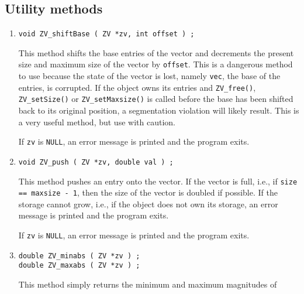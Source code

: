 \subsection{Utility methods}
\label{subsection:ZV:proto:utilities}
\par
\par
\begin{enumerate}
\item
\begin{verbatim}
void ZV_shiftBase ( ZV *zv, int offset ) ;
\end{verbatim}
This method shifts the base entries of the vector and decrements
the present size and maximum size of the vector by {\tt offset}.
This is a dangerous method to use because the state of the vector
is lost, namely {\tt vec}, the base of the entries, is corrupted.
If the object owns its entries and {\tt ZV\_free()}, 
{\tt ZV\_setSize()} or {\tt ZV\_setMaxsize()} is called before 
the base has been shifted back to
its original position, a segmentation violation will likely result.
This is a very useful method, but use with caution.
\par {}
If {\tt zv} is {\tt NULL}, 
an error message is printed and the program exits.
\item
\begin{verbatim}
void ZV_push ( ZV *zv, double val ) ;
\end{verbatim}
This method pushes an entry onto the vector.
If the vector is full, i.e., if {\tt size == maxsize - 1},
then the size of the vector is doubled if possible.
If the storage cannot grow, i.e., if the object does not own its
storage, an error message is printed and the program exits.
\par {}
If {\tt zv} is {\tt NULL}, 
an error message is printed and the program exits.
\item
\begin{verbatim}
double ZV_minabs ( ZV *zv ) ;
double ZV_maxabs ( ZV *zv ) ;
\end{verbatim}
This method simply returns the minimum and maximum magnitudes of

\end{enumerate}

